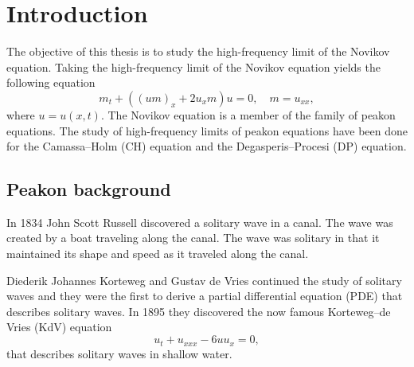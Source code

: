 \documentclass[english,master]{liumaiex}
\theoremstyle{plain}
\theoremstyle{definition}
\begin{document}




\tableofcontents

\newpage



%
%

\section{Introduction}

The objective of this thesis is to study the high-frequency limit of the Novikov equation. Taking the high-frequency limit of the Novikov equation yields the following equation
\begin{equation} \label{eq:Novikov_high_freq}
	m_t + ((um)_x + 2u_xm) u = 0,\quad m = u_{xx},
\end{equation}
where $u = u(x, t)$. The Novikov equation is a member of the family of peakon equations. The study of high-frequency limits of peakon equations have been done for the Camassa--Holm (CH) equation and the Degasperis--Procesi (DP) equation.

\subsection{Peakon background}

In 1834 John Scott Russell discovered a solitary wave in a canal. The wave was created by a boat traveling along the canal. The wave was solitary in that it maintained its shape and speed as it traveled along the canal.

Diederik Johannes Korteweg and Gustav de Vries continued the study of solitary waves and they were the first to derive a partial differential equation (PDE) that describes solitary waves. In 1895 they discovered the now famous Korteweg--de Vries (KdV) equation
\begin{equation}
	u_t + u_{xxx} - 6uu_x = 0,
\end{equation}
that describes solitary waves in shallow water.
\end{document}
